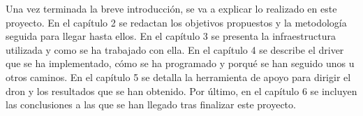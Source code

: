 Una vez terminada la breve introducción, se va a explicar lo realizado en
este proyecto. En el capítulo 2 se redactan los objetivos propuestos y la metodología
seguida para llegar hasta ellos. En el capítulo 3 se presenta la infraestructura utilizada
y como se ha trabajado con ella. En el capítulo 4 se describe el driver que se ha implementado,
cómo se ha programado y porqué se han seguido unos u otros caminos. En el capítulo
5 se detalla la herramienta de apoyo para dirigir el dron y los resultados que se han obtenido.
Por último, en el capítulo 6 se incluyen las conclusiones a las que se han llegado tras
finalizar este proyecto.
